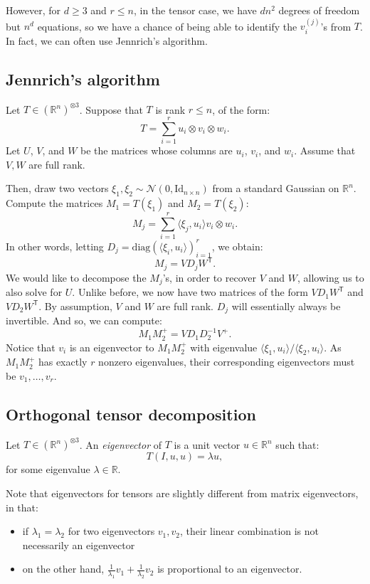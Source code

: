 However, for $d \geq 3$ and $r \leq n$, in the tensor case, we have $dn^2$ degrees of freedom but $n^d$ equations, so we have a chance of being able to identify the $v_i^{(j)}$'s from $T$. In fact, we can often use Jennrich's algorithm. 

\subsection{Jennrich's algorithm} Let $T \in (\mathbb{R}^n)^{\otimes 3}$. Suppose that $T$ is rank $r \leq n$, of the form:
\[T = \sum_{i=1}^r u_i \otimes v_i \otimes w_i.\]
Let $U$, $V$, and $W$ be the matrices whose columns are $u_i$, $v_i$, and $w_i$. Assume that $V,W$ are full rank.

Then, draw two vectors $\xi_1, \xi_2 \sim \mathcal{N}(0,\mathrm{Id}_{n\times n})$ from a standard Gaussian on $\mathbb{R}^n$. Compute the matrices $M_1 = T(\xi_1)$ and $M_2 = T(\xi_2)$:
\[M_j = \sum_{i=1}^r \langle \xi_j, u_i\rangle v_i \otimes w_i.\]
In other words, letting $D_j = \mathrm{diag}(\langle \xi_i , u_i\rangle)_{i=1}^r$, we obtain:
\[M_j = VD_jW^\mathsf{T}.\]
We would like to decompose the $M_j$'s, in order to recover $V$ and $W$, allowing us to also solve for $U$. Unlike before, we now have two matrices of the form $VD_1W^\mathsf{T}$ and $VD_2W^\mathsf{T}$. By assumption, $V$ and $W$ are full rank. $D_j$ will essentially always be invertible. And so, we can compute:
\[M_1M_2^+ = V D_1D_2^{-1} V^+.\]
Notice that $v_i$ is an eigenvector to $M_1M_2^+$ with eigenvalue $\langle \xi_1, u_i\rangle / \langle \xi_2, u_i\rangle$. As $M_1 M_2^+$ has exactly $r$ nonzero eigenvalues, their corresponding eigenvectors must be $v_1,\dotsc, v_r$.

\subsection{Orthogonal tensor decomposition}
\begin{definition}
Let $T \in (\mathbb{R}^n)^{\otimes 3}$. An \emph{eigenvector} of $T$ is a unit vector $u \in \mathbb{R}^n$ such that:
\[T(I,u,u) = \lambda u,\]
for some eigenvalue $\lambda \in \mathbb{R}$. 
\end{definition}

Note that eigenvectors for tensors are slightly different from matrix eigenvectors, in that:
\begin{itemize}
    \item if $\lambda_1 = \lambda_2$ for two eigenvectors $v_1,v_2$, their linear combination is not necessarily an eigenvector
    \item on the other hand, $\frac{1}{\lambda_1} v_1 + \frac{1}{\lambda_2} v_2$ is proportional to an eigenvector.
\end{itemize}

